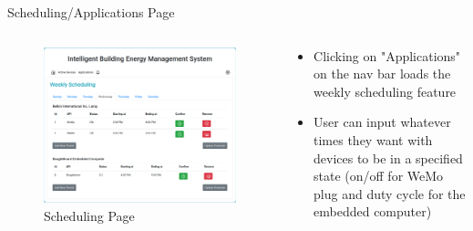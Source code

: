 \documentclass{beamer}
\begin{document}
\begin{frame}{Scheduling/Applications Page}{} %

    \begin{columns}
      \begin{figure}
            \centering
            \includegraphics[scale=0.15]{figs/Applications_screen.png}
            \caption{Scheduling Page}
            \label{fig:schedulingl}
        \end{figure}
        \begin{block}{}
          \begin{itemize}
            \item Clicking on "Applications" on the nav bar loads the weekly scheduling feature
            \item User can input whatever times they want with devices to be in a specified state (on/off for WeMo plug and duty cycle for the embedded computer)
        \end{itemize}
        \end{block}
    \end{columns}
\end{frame}
\end{document}
